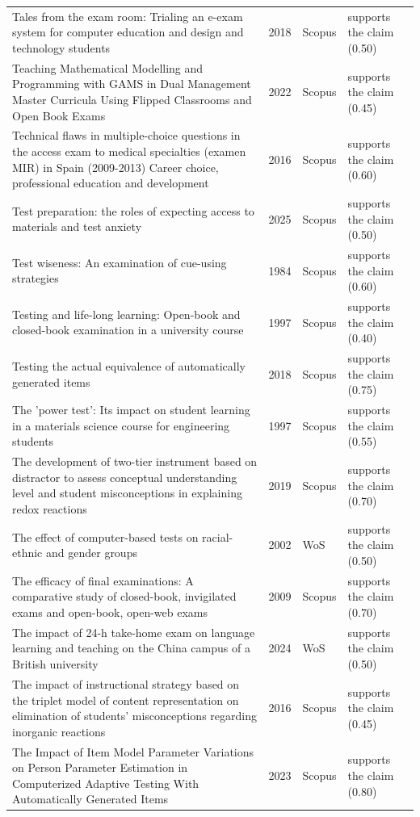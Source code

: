 \begin{longtable}{@{}%
  >{\raggedright\arraybackslash}p{}c%
  >{\raggedright\arraybackslash}p{}%
  >{\raggedright\arraybackslash}p{}@{}}
Tales from the exam room: Trialing an e-exam system for computer education and design and technology students & 2018 & Scopus & supports the claim (0.50) \\
Teaching Mathematical Modelling and Programming with GAMS in Dual Management Master Curricula Using Flipped Classrooms and Open Book Exams & 2022 & Scopus & supports the claim (0.45) \\
Technical flaws in multiple-choice questions in the access exam to medical specialties (\textquotedbl{}examen MIR\textquotedbl{}) in Spain (2009-2013) Career choice, professional education and development & 2016 & Scopus & supports the claim (0.60) \\
Test preparation: the roles of expecting access to materials and test anxiety & 2025 & Scopus & supports the claim (0.50) \\
Test wiseness: An examination of cue-using strategies & 1984 & Scopus & supports the claim (0.60) \\
Testing and life-long learning: Open-book and closed-book examination in a university course & 1997 & Scopus & supports the claim (0.40) \\
Testing the actual equivalence of automatically generated items & 2018 & Scopus & supports the claim (0.75) \\
The 'power test': Its impact on student learning in a materials science course for engineering students & 1997 & Scopus & supports the claim (0.55) \\
The development of two-tier instrument based on distractor to assess conceptual understanding level and student misconceptions in explaining redox reactions & 2019 & Scopus & supports the claim (0.70) \\
The effect of computer-based tests on racial-ethnic and gender groups & 2002 & WoS & supports the claim (0.50) \\
The efficacy of final examinations: A comparative study of closed-book, invigilated exams and open-book, open-web exams & 2009 & Scopus & supports the claim (0.70) \\
The impact of 24-h take-home exam on language learning and teaching on the China campus of a British university & 2024 & WoS & supports the claim (0.50) \\
The impact of instructional strategy based on the triplet model of content representation on elimination of students' misconceptions regarding inorganic reactions & 2016 & Scopus & supports the claim (0.45) \\
The Impact of Item Model Parameter Variations on Person Parameter Estimation in Computerized Adaptive Testing With Automatically Generated Items & 2023 & Scopus & supports the claim (0.80) \\

\end{longtable}

